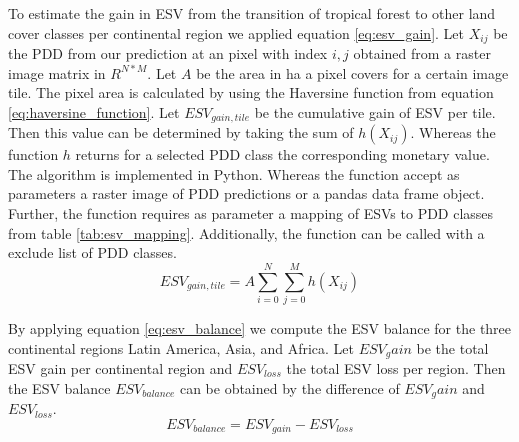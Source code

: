 		To estimate the gain in \ac{ESV} from the transition of tropical forest to other land cover classes per continental region we applied equation \ref{eq:esv_gain}. Let $X_{ij}$ be the \ac{PDD} from our prediction at an pixel with index $i,j$ obtained from a raster image matrix in $R^{N*M}$. Let $A$ be the area in ha a pixel covers for a certain image tile. The pixel area is calculated by using the Haversine function from equation \ref{eq:haversine_function}. Let $ESV_{gain,tile}$ be the cumulative gain of \ac{ESV} per tile. Then this value can be determined by taking the sum of $h(X_{ij})$. Whereas the function $h$ returns for a selected \ac{PDD} class the corresponding monetary value. The algorithm is implemented in Python. Whereas the function accept as parameters a raster image of \ac{PDD} predictions or a pandas data frame object. Further, the function requires as parameter a mapping of \acp{ESV} to \ac{PDD} classes from table \ref{tab:esv_mapping}. Additionally, the function can be called with a exclude list of \ac{PDD} classes.
		\begin{equation}
		\label{eq:esv_gain}
			ESV_{gain,tile} = A\displaystyle\sum_{i=0}^{N}\displaystyle\sum_{j=0}^{M} h(X_{ij})
		\end{equation}

		By applying equation \ref{eq:esv_balance} we compute the \ac{ESV} balance for the three continental regions Latin America, Asia, and Africa. Let $ESV_gain$ be the total \ac{ESV} gain per continental region and $ESV_{loss}$ the total \ac{ESV} loss per region. Then the \ac{ESV} balance $ESV_{balance}$ can be obtained by the difference of $ESV_gain$ and $ESV_{loss}$.
		\begin{equation}
		\label{eq:esv_balance}
			ESV_{balance} = ESV_{gain} - ESV_{loss}
		\end{equation}

